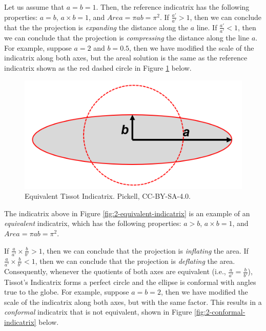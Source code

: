 \documentclass[
]{book}
\begin{document}
Let us assume that \(a = b = 1\). Then, the reference indicatrix has the following properties: \(a=b\), \(a×b=1\), and \(Area=πab=π^2\). If \(\frac{a'}{a'}>1\), then we can conclude that the the projection is \emph{expanding} the distance along the \(a\) line. If \(\frac{a'}{a'}<1\), then we can conclude that the projection is \emph{compressing} the distance along the line \(a\). For example, suppose \(a=2\) and \(b=0.5\), then we have modified the scale of the indicatrix along both axes, but the areal solution is the same as the reference indicatrix shown as the red dashed circle in Figure \ref{fig:2-reference-equivalent} below.

\begin{figure}
\includegraphics[width=0.75\linewidth]{images/02-equivalent-indicatrix} \caption{Equivalent Tissot Indicatrix. Pickell, CC-BY-SA-4.0.}\label{fig:2-reference-equivalent}
\end{figure}

The indicatrix above in Figure \ref{fig:2-equivalent-indicatrix} is an example of an \emph{equivalent} indicatrix, which has the following properties: \(a>b\), \(a×b=1\), and \(Area=πab=π^2\).

If \(\frac{a}{a'}×\frac{b}{b'}>1\), then we can conclude that the projection is \emph{inflating} the area. If \(\frac{a}{a'}×\frac{b}{b'}<1\), then we can conclude that the projection is \emph{deflating} the area. Consequently, whenever the quotients of both axes are equivalent (i.e., \(\frac{a}{a'}=\frac{b}{b'}\)), Tissot's Indicatrix forms a perfect circle and the ellipse is conformal with angles true to the globe. For example, suppose \(a=b=2\), then we have modified the scale of the indicatrix along both axes, but with the same factor. This results in a \emph{conformal} indicatrix that is not equivalent, shown in Figure \ref{fig:2-conformal-indicatrix} below.
\end{document}
